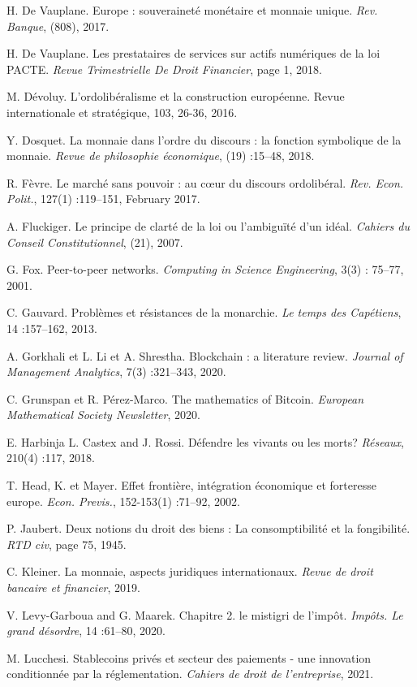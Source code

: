 {H. De Vauplane. Europe : souveraineté monétaire et monnaie unique. \emph{Rev. Banque}, (808), 2017.\par
H. De Vauplane. Les prestataires de services sur actifs numériques de la loi PACTE. \emph{Revue Trimestrielle De Droit Financier}, page 1, 2018.\par
 M. Dévoluy. L’ordolibéralisme et la construction européenne. Revue internationale et stratégique, 103, 26-36, 2016.\par
Y. Dosquet. La monnaie dans l'ordre du discours : la fonction symbolique de la monnaie. \emph{Revue de philosophie économique}, (19) :15–48, 2018.\par
R. Fèvre. Le marché sans pouvoir : au c\oe{}ur du discours ordolibéral. \emph{Rev. Econ. Polit.}, 127(1) :119–151, February 2017.\par
A. Fluckiger. Le principe de clarté de la loi ou l'ambiguïté d'un idéal. \emph{Cahiers du Conseil Constitutionnel}, (21), 2007.\par
G. Fox. Peer-to-peer networks. \emph{Computing in Science Engineering}, 3(3) : 75–77, 2001.\par
C. Gauvard. Problèmes et résistances de la monarchie. \emph{Le temps des Capétiens}, 14 :157–162, 2013.\par
A. Gorkhali et L. Li et A. Shrestha. Blockchain : a literature review. \emph{Journal of Management Analytics}, 7(3) :321–343, 2020.\par
C. Grunspan et R. Pérez-Marco. The mathematics of Bitcoin. \emph{European Mathematical Society Newsletter}, 2020.\par
E. Harbinja L. Castex and J. Rossi. Défendre les vivants ou les morts? \emph{Réseaux}, 210(4) :117, 2018.\par
T. Head, K. et Mayer. Effet frontière, intégration économique et forteresse europe. \emph{Econ. Previs.}, 152-153(1) :71–92, 2002.\par
P. Jaubert. Deux notions du droit des biens : La consomptibilité et la fongibilité. \emph{RTD civ}, page 75, 1945.\par
C. Kleiner. La monnaie, aspects juridiques internationaux. \emph{Revue de droit bancaire et financier}, 2019.\par
V. Levy-Garboua and G. Maarek. Chapitre 2. le mistigri de l'impôt. \emph{Impôts. Le grand désordre}, 14 :61–80, 2020.\par
M. Lucchesi. Stablecoins privés et secteur des paiements - une innovation conditionnée par la réglementation. \emph{Cahiers de droit de l'entreprise}, 2021.\par
}
